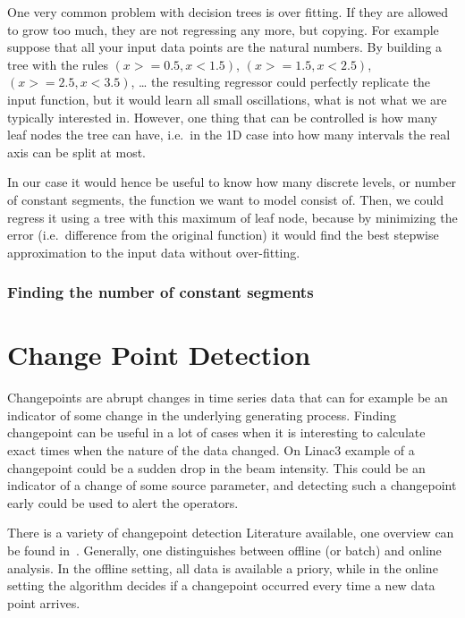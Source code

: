\documentclass[12pt,a4paper]{article}
\begin{document}
One very common problem with decision trees is over fitting. If they are allowed to grow too much, they are not regressing any more, but copying. For example suppose that all your input data points are the natural numbers. By building a tree with the rules \((x >= 0.5, x <1.5)\), \((x >= 1.5, x <2.5)\), \((x >= 2.5, x <3.5)\), \ldots{} the resulting regressor could perfectly replicate the input function, but it would learn all small oscillations, what is not what we are typically interested in. However, one thing that can be controlled is how many leaf nodes the tree can have, i.e.~in the 1D case into how many intervals the real axis can be split at most.

In our case it would hence be useful to know how many discrete levels, or number of constant segments, the function we want to model consist of. Then, we could regress it using a tree with this maximum of leaf node, because by minimizing the error (i.e.~difference from the original function) it would find the best stepwise approximation to the input data without over-fitting.

\hypertarget{finding-the-number-of-constant-segments}{%
\subsubsection{Finding the number of constant
segments}\label{finding-the-number-of-constant-segments}}

\hypertarget{change-point-detection}{%
\section{Change Point Detection}\label{change-point-detection}}

Changepoints are abrupt changes in time series data that can for example be an indicator of some change in the underlying generating process. Finding changepoint can be useful in a lot of cases when it is interesting to calculate exact times when the nature of the data changed. On Linac3 example of a changepoint could be a sudden drop in the beam intensity. This could be an indicator of a change of some source parameter, and detecting such a changepoint early could be used to alert the operators.

There is a variety of changepoint detection Literature available, one overview can be found in~\cite{Aminikhanghahi:surveymethodstime}. Generally, one distinguishes between offline (or batch) and online analysis. In the offline setting, all data is available a priory, while in the online setting the algorithm decides if a changepoint occurred every time a new data point arrives. 
\end{document}
